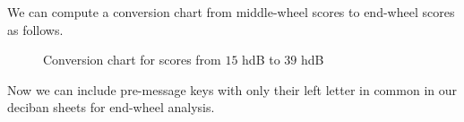 \noindent We can compute a conversion chart from middle-wheel
scores to end-wheel scores as follows.
\begin{figure}[H]
  \begin{center}
  \end{center}
  \caption{Conversion chart for scores from $15$ hdB to $39$ hdB}
\end{figure}
\noindent Now we can include pre-message keys with only their left
letter in common in our deciban sheets for end-wheel analysis.
